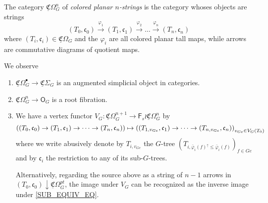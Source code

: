 \documentclass[a4paper,10pt
,draft
]{article}%
\renewcommand{\phi}{\varphi}
\newcommand{\UC}{\underline{\mathfrak C}}
\renewcommand{\1}{\ensuremath{\mathbb{id}}}
\begin{document}
\begin{definition}
      The category $\UC\Omega_G^n$ of \textit{colored planar $n$-strings} is the category
      whoses objects are strings
      \begin{equation}
            (T_0,\mathfrak c_0)
            \xrightarrow{\phi_1} (T_1, \mathfrak c_1)
            \xrightarrow{\phi_2} \ldots
            \xrightarrow{\phi_n} (T_n, \mathfrak c_n)
      \end{equation}
      where $(T_i, \mathfrak c_i) \in \UC\Omega_G$ and the $\phi_i$ are all colored planar tall maps,
      while arrows are commutative diagrams of quotient maps.
\end{definition}

\begin{remark}
      We observe
      \begin{enumerate}
      \item $\UC\Omega_G^\bullet \to \UC\Sigma_G$ is an augmented simplicial object in categories.
      \item $\UC\Omega_G^n \to \mathsf O_G$ is a root fibration.
      \item We have a vertex functor $V_G: \UC\Omega_G^{n+1} \to \mathsf F_s \wr \UC\Omega_G^n$ by
            \begin{equation}
                  \left(
                  (T_0,\mathfrak c_0)
                  \to (T_1, \mathfrak c_1)
                  \to \dots
                  \to (T_n, \mathfrak c_n)
                  \large)
                  \mapsto
                  \large(
                  (T_{1,v_{Ge}},\mathfrak c_1)
                  \to \dots \to
                  (T_{n,v_{Ge}}, \mathfrak c_n)
                  \right)_{v_{Ge} \in V_G(T_0)}
            \end{equation}
            where we write abusively denote by $T_{i,v_{Ge}}$ the $G$-tree $(T_{i,\bar\phi_i(f)^\uparrow \leq \bar\phi_i(f)})_{f \in Ge}$
            and by $\mathfrak c_i$ the restriction to any of its sub-$G$-trees.

            Alternatively, regarding the source above as a string of $n-1$ arrows in
            $(T_0, \mathfrak c_0) \downarrow \UC\Omega_G^{pt}$,
            the image under $V_G$ can be recognized as the inverse image under \eqref{SUB_EQUIV_EQ}.
      \end{enumerate}
\end{remark}
\end{document}
